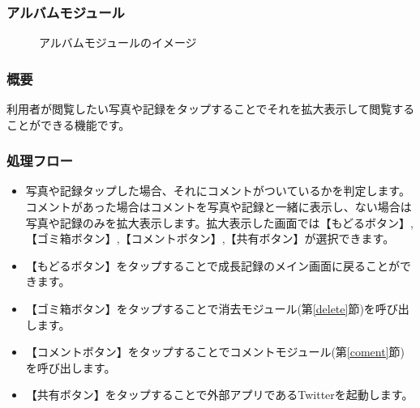 \documentclass[a4j]{jarticle}
\begin{document}
\subsubsection{アルバムモジュール\label{albam}}
\begin{figure}[H]
    \begin{center}
    \caption {アルバムモジュールのイメージ}
    \label{functionselection}
    \end{center}
\end{figure}

\subsubsection*{概要}
利用者が閲覧したい写真や記録をタップすることでそれを拡大表示して閲覧することができる機能です。

\subsubsection*{処理フロー}
\begin{itemize}
\item 写真や記録タップした場合、それにコメントがついているかを判定します。コメントがあった場合はコメントを写真や記録と一緒に表示し、ない場合は写真や記録のみを拡大表示します。拡大表示した画面では【もどるボタン】,【ゴミ箱ボタン】,【コメントボタン】,【共有ボタン】が選択できます。
\item 【もどるボタン】をタップすることで成長記録のメイン画面に戻ることができます。
\item 【ゴミ箱ボタン】をタップすることで消去モジュール(第\ref{delete}節)を呼び出します。
\item 【コメントボタン】をタップすることでコメントモジュール(第\ref{coment}節)を呼び出します。
\item 【共有ボタン】をタップすることで外部アプリであるTwitterを起動します。
\end{itemize}
\end{document}
